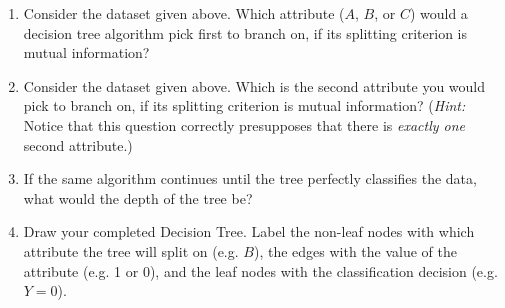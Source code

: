 \begin{enumerate}
    \begin{tcolorbox}[fit,height=2cm,blank, borderline={1pt}{-2pt},nobeforeafter]
    \end{tcolorbox}
    
    \item Consider the dataset given above. Which attribute ($A$, $B$, or $C$) would a decision tree algorithm pick first to branch on, if its splitting criterion is mutual information?
    
    \begin{tcolorbox}[fit,height=2cm,blank, borderline={1pt}{-2pt},nobeforeafter]
    \end{tcolorbox}
    
    \item Consider the dataset given above. Which is the second attribute you would pick to branch on, if its splitting criterion is mutual information? (\emph{Hint:} Notice that this question correctly presupposes that there is \emph{exactly one} second attribute.)
    
    \begin{tcolorbox}[fit,height=2cm,blank, borderline={1pt}{-2pt},nobeforeafter]
    \end{tcolorbox}
    
    \item If the same algorithm continues until the tree perfectly classifies the data, what would the depth of the tree be?

    \begin{tcolorbox}[fit,height=2cm,blank, borderline={1pt}{-2pt},nobeforeafter]
    \end{tcolorbox}
    
    \item Draw your completed Decision Tree. Label the non-leaf nodes with which attribute the tree will split on (e.g. $B$), the edges with the value of the attribute (e.g. 1 or 0), and the leaf nodes with the classification decision (e.g. $Y=0$).
    
    \begin{tcolorbox}[fit,height=5cm,blank, borderline={1pt}{-2pt},nobeforeafter]
    \end{tcolorbox}
 
\end{enumerate}

